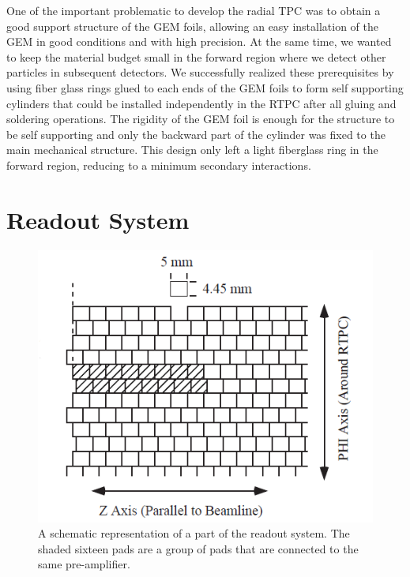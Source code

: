 \documentclass[twocolumn,showpacs,superscriptaddress,groupedaddress]{revtex4}
\begin{document}
One of the important problematic to develop the radial TPC was to obtain a 
good support structure of the GEM foils, allowing an easy installation of the 
GEM in good conditions and with high precision. At the same time, we wanted to 
keep the material budget small in the forward region where we detect other 
particles in subsequent detectors. We successfully realized these prerequisites 
by using fiber glass rings glued to each ends of the GEM foils to form self 
supporting cylinders that could be installed independently in the RTPC after 
all gluing and soldering operations. The rigidity of the GEM foil is enough
for the structure to be self supporting and only the 
backward part of the cylinder was fixed to the main mechanical structure. This 
design only left a light fiberglass ring in the forward region, reducing to a 
minimum secondary interactions.

\section{Readout System} \label{sec_readout}

\begin{figure}[tb]
   \centering
   \includegraphics[scale=0.55]{fig/PADs.png}
   \caption[]{A schematic representation of a part of the readout system.  The 
   shaded sixteen pads are a group of pads that are connected to the same 
pre-amplifier.} \label{fig:PADs}
\end{figure}
\end{document}
